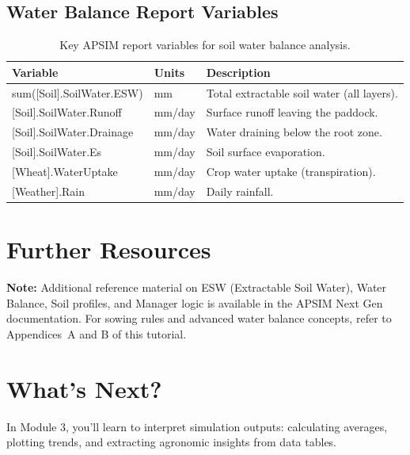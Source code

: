 \subsection{Water Balance Report Variables}

\begin{table}[H]
\centering
\caption{Key APSIM report variables for soil water balance analysis.}
\label{tab:watervars}
\renewcommand{\arraystretch}{1.3}
\begin{tabularx}{\textwidth}{>{\ttfamily\small}p{5.5cm} >{\centering\arraybackslash}p{1.8cm} X}
\toprule
\normalfont\textbf{Variable} & \textbf{Units} & \textbf{Description} \\
\midrule
sum([Soil].SoilWater.ESW)      & mm       & Total extractable soil water (all layers). \\
{[Soil].SoilWater.Runoff}      & mm/day   & Surface runoff leaving the paddock. \\
{[Soil].SoilWater.Drainage}    & mm/day   & Water draining below the root zone. \\
{[Soil].SoilWater.Es}          & mm/day   & Soil surface evaporation. \\
{[Wheat].WaterUptake}          & mm/day   & Crop water uptake (transpiration). \\
{[Weather].Rain}               & mm/day   & Daily rainfall. \\
\bottomrule
\end{tabularx}
\end{table}

\section{Further Resources}

\begin{tipbox}
\textbf{Note:} Additional reference material on ESW (Extractable Soil Water), Water Balance, Soil profiles, and Manager logic is available in the APSIM Next Gen documentation. For sowing rules and advanced water balance concepts, refer to Appendices~A and B of this tutorial.
\end{tipbox}

\section{What's Next?}

In Module 3, you'll learn to interpret simulation outputs: calculating averages, plotting trends, and extracting agronomic insights from data tables.

